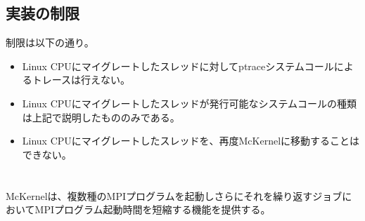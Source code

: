 \documentclass[twoside,11pt,fleqn]{book}
\begin{document}

\subsection{実装の制限}
制限は以下の通り。
\begin{itemize}
\item Linux CPUにマイグレートしたスレッドに対してptraceシステムコールによるトレースは行えない。
\item Linux CPUにマイグレートしたスレッドが発行可能なシステムコールの種類は上記で説明したもののみである。
\item Linux CPUにマイグレートしたスレッドを、再度McKernelに移動することはできない。
\end{itemize}

\section{}
McKernelは、複数種のMPIプログラムを起動しさらにそれを繰り返すジョブにおいてMPIプログラム起動時間を短縮する機能を提供する。
\end{document}
